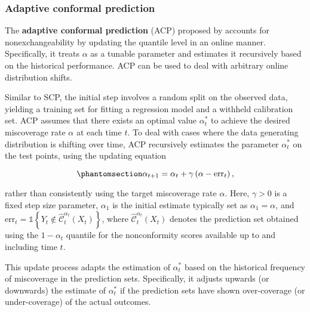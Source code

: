 \documentclass[
  11pt,
  a4paper,
]{article}
\theoremstyle{plain}
\theoremstyle{plain}
\theoremstyle{remark}
\begin{document}
\subsubsection{Adaptive conformal
prediction}\label{adaptive-conformal-prediction}

The \textbf{adaptive conformal prediction} (ACP) proposed by
\textcite{gibbs2021} accounts for nonexchangeability by updating the
quantile level in an online manner. Specifically, it treats \(\alpha\)
as a tunable parameter and estimates it recursively based on the
historical performance. ACP can be used to deal with arbitrary online
distribution shifts.

Similar to SCP, the initial step involves a random split on the observed
data, yielding a training set for fitting a regression model and a
withheld calibration set. ACP assumes that there exists an optimal value
\(\alpha_{t}^{*}\) to achieve the desired miscoverage rate \(\alpha\) at
each time \(t\). To deal with cases where the data generating
distribution is shifting over time, ACP recursively estimates the
parameter \(\alpha_t^{*}\) on the test points, using the updating
equation

\begin{equation}\phantomsection\label{eq-acp}{
\alpha_{t+1} = \alpha_{t} + \gamma\left(\alpha - \mathrm{err}_t\right),
}\end{equation}

rather than consistently using the target miscoverage rate \(\alpha\).
Here, \(\gamma > 0\) is a fixed step size parameter, \(\alpha_1\) is the
initial estimate typically set as \(\alpha_1=\alpha\), and
\(\mathrm{err}_t = \mathbb{1}\left\{Y_t \notin \hat{\mathcal{C}}_{t}^{\alpha_t}\left(X_t\right)\right\}\),
where \(\hat{\mathcal{C}}_{t}^{\alpha_t}\left(X_t\right)\) denotes the
prediction set obtained using the \(1-\alpha_{t}\) quantile for the
nonconformity scores available up to and including time \(t\).

This update process adapts the estimation of \(\alpha_{t}^{*}\) based on
the historical frequency of miscoverage in the prediction sets.
Specifically, it adjusts upwards (or downwards) the estimate of
\(\alpha_{t}^{*}\) if the prediction sets have shown over-coverage (or
under-coverage) of the actual outcomes.
\end{document}
